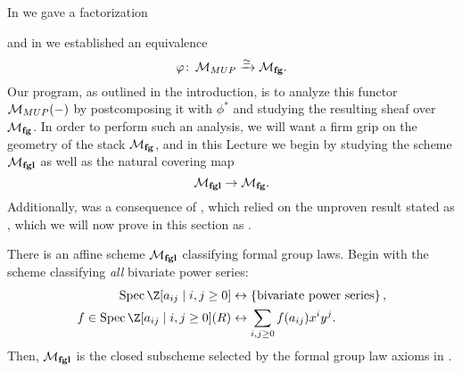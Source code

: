 In  we gave a factorization
\begin{center}
\end{center}
and in  we established an equivalence \[\varphi\colon\thinspace \mathcal{M}_{MUP} \xrightarrow{\simeq} \mathcal{M}_{\mathbf{fg}}.\]  Our program, as outlined in the introduction, is to analyze this functor \(\mathcal{M}_{MUP}(-)\) by postcomposing it with \(\phi^*\) and studying the resulting sheaf over \(\mathcal{M}_{\mathbf{fg}}\).  In order to perform such an analysis, we will want a firm grip on the geometry of the stack \(\mathcal{M}_{\mathbf{fg}}\), and in this Lecture we begin by studying the scheme \(\mathcal{M}_{\mathbf{fgl}}\) as well as the natural covering map \[\mathcal{M}_{\mathbf{fgl}} \to \mathcal{M}_{\mathbf{fg}}.\]  Additionally,  was a consequence of , which relied on the unproven result stated as , which we will now prove in this section as .

\begin{definition}\label{MfglDefn}
There is an affine scheme \(\mathcal{M}_{\mathbf{fgl}}\) classifying formal group laws.  Begin with the scheme classifying \emph{all} bivariate power series:
\begin{align*}
\Spec \Z[a_{ij} \mid i, j \ge 0] & \leftrightarrow \left\{ \text{bivariate power series} \right\}, \\
f \in \Spec\Z[a_{ij} \mid i, j \ge 0](R) & \leftrightarrow \sum_{i, j \ge 0} f(a_{ij}) x^i y^j.
\end{align*}
Then, \(\mathcal{M}_{\mathbf{fgl}}\) is the closed subscheme selected by the formal group law axioms in .
\end{definition}

